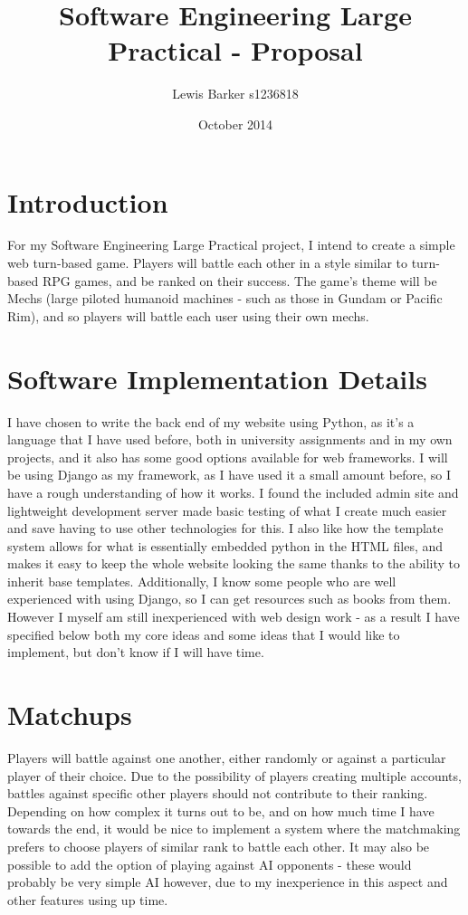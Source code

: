 \documentclass{article}
\begin{document}
\author{Lewis Barker s1236818}
\title{Software Engineering Large Practical - Proposal}
\date{October 2014}
\maketitle

\section{Introduction}
For my Software Engineering Large Practical project, I intend to create a simple web turn-based game. Players will battle each other in a style similar to turn-based RPG games, and be ranked on their success. The game's theme will be Mechs (large piloted humanoid machines - such as those in Gundam or Pacific Rim), and so players will battle each user using their own mechs.

\section{Software Implementation Details}
I have chosen to write the back end of my website using Python, as it's a language that I have used before, both in university assignments and in my own projects, and it also has some good options available for web frameworks. I will be using Django as my framework, as I have used it a small amount before, so I have a rough understanding of how it works. I found the included admin site and lightweight development server made basic testing of what I create much easier and save having to use other technologies for this. I also like how the template system allows for what is essentially embedded python in the HTML files, and makes it easy to keep the whole website looking the same thanks to the ability to inherit base templates. Additionally, I know some people who are well experienced with using Django, so I can get resources such as books from them. However I myself am still inexperienced with web design work - as a result I have specified below both my core ideas and some ideas that I would like to implement, but don't know if I will have time.

\section{Matchups}
Players will battle against one another, either randomly or against a particular player of their choice. Due to the possibility of players creating multiple accounts, battles against specific other players should not contribute to their ranking.
Depending on how complex it turns out to be, and on how much time I have towards the end, it would be nice to implement a system where the matchmaking prefers to choose players of similar rank to battle each other.
It may also be possible to add the option of playing against AI opponents - these would probably be very simple AI however, due to my inexperience in this aspect and other features using up time.
\end{document}

